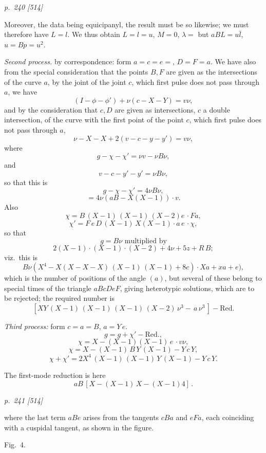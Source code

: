 \documentclass[11pt,a4paper]{article}
\theoremstyle{plain}
\theoremstyle{definition}
\begin{document}
\clearpage

\bigskip
\textit{p.~240 [514]}
\smallskip

Moreover, the data being equicipanyl, the result must be so likewise; we must
therefore have $L=l$.  We thus obtain $L=l=u$, $M=0$, $\lambda=$ but $aBL=u\bar{l}$, $u=Bp=u^2$.

\textit{Second process.}  by correspondence:  form $a=c=e=$, $D=F=a$.  We have
also from the special consideration that the points $B, F$ are given as the intersections
of the curve $a$, by the joint of the joint $c$, which first pulse does not pass
through $a$, we have
\[
(I-\phi-\phi')+\nu (c-X-Y)=v\nu,
\]
and by the consideration that $c, D$ are given as intersections, $c$ a double intersection,
of the curve with the first point of the point $c$, which first pulse does not pass
through $a$,
\[
\nu-X-X+2(v-c-y-y')=v\nu,
\]
where
\[
g-\chi-\chi'=\nu v-\nu B \nu,
\]
and
\[
v-c-y'-y'=\nu B\nu,
\]
so that this is
\[
g-\chi-\chi'=4\nu B\nu,
\]
\[
=4\nu (aB-X(X-1))\cdot v.
\]
Also
\[
\chi=B\,(X-1)\,(X-1)\,(X-2)e\,\cdot Fa,
\]
\[
\chi'=F\,e\,D\,(X-1)\,X(X-1)\cdot a\,e\,\cdot \chi,
\]
so that
\[
g=B\nu \text{ multiplied by}
\]
\[
2(X-1)\cdot (X-1)\cdot (X-2)+4\nu+5z+R\,B;
\]
viz.\ this is
\[
B\nu (X^4-X(X-X-X)\,(X-1)\,(X-1)+8c)\cdot Xa+xa+e),
\]
which is the number of positions of the angle $(a)$, but several of these belong to
special times of the triangle $aBcDeF$, giving heterotypic solutions, which are to be
rejected; the required number is
\[
[XY\,(X-1)\,(X-1)\,(X-1)\,(X-2)\,\nu^3-\,a\,\nu^3\,]-\text{Red.}
\]

\bigskip
\textit{Third process:}  form $c=a=B$, $a=Y\,e$.
\[
g=g+\chi'-\text{Red.},
\]
\[
\chi=X-(X-1)(X-1)\,e\,\cdot v\nu,
\]
\[
\chi=X-(X-1)\,B\,Y\,(X-1)-Y\,c\,Y,
\]
\[
\chi+\chi'=2X^4\,(X-1)\,(X-1)\,Y\,(X-1)-Y\,c\,Y.
\]

The first-mode reduction is here
\[
aB\,[X-(X-1)\,X-(X-1)4]\,.
\]

\clearpage

\bigskip
\textit{p.~241 [514]}
\smallskip

where the last term $aBe$ arises from the tangents $cBa$ and $eFa$, each coinciding with
a cuspidal tangent, as shown in the figure.

\begin{center}
Fig.\ 4.\\
\end{center}
\end{document}
